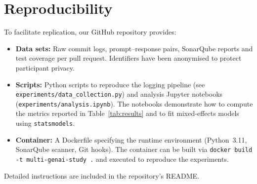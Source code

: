\documentclass[conference]{IEEEtran}
\begin{document}
\section{Reproducibility}
To facilitate replication, our GitHub repository provides:
\begin{itemize}
  \item \textbf{Data sets:} Raw commit logs, prompt–response pairs, SonarQube reports and test coverage per pull request.  Identifiers have been anonymised to protect participant privacy.
  \item \textbf{Scripts:} Python scripts to reproduce the logging pipeline (see \texttt{experiments/data\_collection.py}) and analysis Jupyter notebooks (\texttt{experiments/analysis.ipynb}).  The notebooks demonstrate how to compute the metrics reported in Table \ref{tab:results} and to fit mixed‑effects models using \texttt{statsmodels}.
  \item \textbf{Container:} A Dockerfile specifying the runtime environment (Python 3.11, SonarQube scanner, Git hooks).  The container can be built via \texttt{docker build -t multi-genai-study .} and executed to reproduce the experiments.
\end{itemize}
Detailed instructions are included in the repository’s README.
\end{document}
